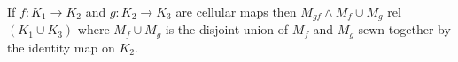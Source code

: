 If $f: K_1 \rightarrow K_2$ and $g: K_2 \rightarrow K_3$ are cellular maps then $M_{gf} \wedge M_f \cup M_g$ rel $(K_1 \cup K_3)$ where $M_f \cup M_g$ is the disjoint union of $M_f$ and $M_g$ sewn together by the identity map on $K_2$.

